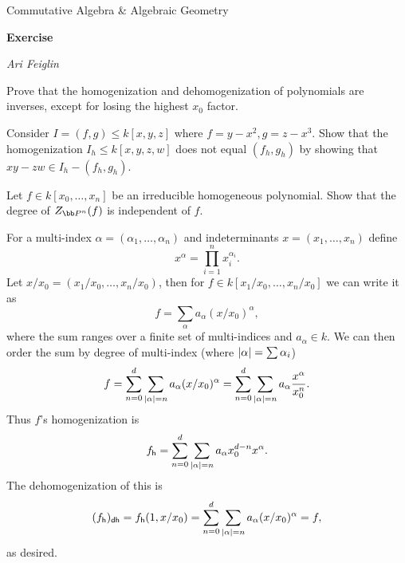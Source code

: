 


\def\enumindent{0cm}

\def\printmcount{\the\counter{section}.\the\counter{math counter}}
\setcounter{section}{9}

\centerline{Commutative Algebra \& Algebraic Geometry}
\medskip
\centerline{\bf Exercise \the{}}
\smallskip
\centerline{\it Ari Feiglin}

\def\h{{\sf h}} \def\dh{{\sf dh}}
\def\rad{{\rm rad}}

\bprob

    \benum
        \item Prove that the homogenization and dehomogenization of polynomials are inverses, except for losing the highest $x_0$ factor.
        \item Consider $I=(f,g)\leq k[x,y,z]$ where $f=y-x^2,g=z-x^3$.
        Show that the homogenization $I_h\leq k[x,y,z,w]$ does not equal $(f_h,g_h)$ by showing that $xy-zw\in I_h-(f_h,g_h)$.
        \item Let $f\in k[x_0,\dots,x_n]$ be an irreducible homogeneous polynomial.
        Show that the degree of $Z_{\bP^n}(f)$ is independent of $f$.
    \eenum

\eprob

\benum
    \item For a multi-index $\alpha=(\alpha_1,\dots,\alpha_n)$ and indeterminants $x=(x_1,\dots,x_n)$ define
    $$ x^\alpha = \prod_{i=1}^n x_i^{\alpha_i} . $$
    Let $x/x_0=(x_1/x_0,\dots,x_n/x_0)$, then for $f\in k[x_1/x_0,\dots,x_n/x_0]$ we can write it as
    $$ f = \sum_\alpha a_\alpha (x/x_0)^\alpha, $$
    where the sum ranges over a finite set of multi-indices and $a_\alpha\in k$.
    We can then order the sum by degree of multi-index (where $\mathopen{}\mathclose{\left|\alpha\right|}=\sum\alpha_i$)
    $$ f = \sum_{n=0}^d\sum_{\mathopen{}\mathclose{\left|\alpha\right|}=n}a_\alpha(x/x_0)^\alpha = \sum_{n=0}^d\sum_{\mathopen{}\mathclose{\left|\alpha\right|}=n}a_\alpha{{x^\alpha}\over{x_0^n}} . $$
    Thus $f$'s homogenization is
    $$ f_\h = \sum_{n=0}^d\sum_{\abs\alpha=n}a_\alpha x_0^{d-n}x^\alpha . $$
    The dehomogenization of this is
    $$ (f_\h)_\dh = f_\h(1,x/x_0) = \sum_{n=0}^d\sum_{\abs\alpha=n}a_\alpha(x/x_0)^\alpha = f , $$
    as desired.


